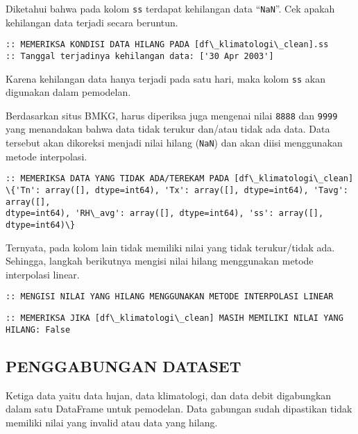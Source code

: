 \documentclass[11pt]{article}
\begin{document}
    Diketahui bahwa pada kolom \texttt{ss} terdapat kehilangan data
``\texttt{NaN}''. Cek apakah kehilangan data terjadi secara beruntun.

    \begin{Verbatim}[commandchars=\\\{\}]
:: MEMERIKSA KONDISI DATA HILANG PADA [df\_klimatologi\_clean].ss
:: Tanggal terjadinya kehilangan data: ['30 Apr 2003']
    \end{Verbatim}

    Karena kehilangan data hanya terjadi pada satu hari, maka kolom
\texttt{ss} akan digunakan dalam pemodelan.

    Berdasarkan situs BMKG, harus diperiksa juga mengenai nilai
\texttt{8888} dan \texttt{9999} yang menandakan bahwa data tidak terukur
dan/atau tidak ada data. Data tersebut akan dikoreksi menjadi nilai
hilang (\texttt{NaN}) dan akan diisi menggunakan metode interpolasi.

    \begin{Verbatim}[commandchars=\\\{\}]
:: MEMERIKSA DATA YANG TIDAK ADA/TEREKAM PADA [df\_klimatologi\_clean]
\{'Tn': array([], dtype=int64), 'Tx': array([], dtype=int64), 'Tavg': array([],
dtype=int64), 'RH\_avg': array([], dtype=int64), 'ss': array([], dtype=int64)\}
    \end{Verbatim}

    Ternyata, pada kolom lain tidak memiliki nilai yang tidak terukur/tidak
ada. Sehingga, langkah berikutnya mengisi nilai hilang menggunakan
metode interpolasi linear.

    \begin{Verbatim}[commandchars=\\\{\}]
:: MENGISI NILAI YANG HILANG MENGGUNAKAN METODE INTERPOLASI LINEAR
    \end{Verbatim}

    \begin{Verbatim}[commandchars=\\\{\}]
:: MEMERIKSA JIKA [df\_klimatologi\_clean] MASIH MEMILIKI NILAI YANG HILANG: False
    \end{Verbatim}

    \hypertarget{penggabungan-dataset}{%
\subsection{PENGGABUNGAN DATASET}\label{penggabungan-dataset}}

Ketiga data yaitu data hujan, data klimatologi, dan data debit
digabungkan dalam satu DataFrame untuk pemodelan. Data gabungan sudah
dipastikan tidak memiliki nilai yang invalid atau data yang hilang.
\end{document}
